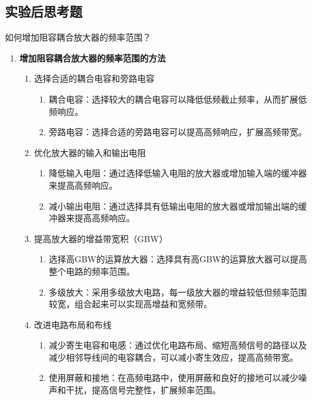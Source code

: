\documentclass[dvipsnames, svgnames,a4paper,11pt]{article}
\begin{document}
	
	

	\clearpage

	\subsection{实验后思考题}
	
	\begin{question}
		如何增加阻容耦合放大器的频率范围？
	\end{question}
	
		\begin{enumerate}
			\item \textbf{增加阻容耦合放大器的频率范围的方法}
			\begin{enumerate}
				\item 选择合适的耦合电容和旁路电容
				\begin{enumerate}
					\item 耦合电容：选择较大的耦合电容可以降低低频截止频率，从而扩展低频响应。
					\item 旁路电容：选择合适的旁路电容可以提高高频响应，扩展高频带宽。
				\end{enumerate}
				
				\item 优化放大器的输入和输出电阻
				\begin{enumerate}
					\item 降低输入电阻：通过选择低输入电阻的放大器或增加输入端的缓冲器来提高高频响应。
					\item 减小输出电阻：通过选择具有低输出电阻的放大器或增加输出端的缓冲器来提高高频响应。
				\end{enumerate}
		
				\item 提高放大器的增益带宽积（GBW）
				\begin{enumerate}
					\item 选择高GBW的运算放大器：选择具有高GBW的运算放大器可以提高整个电路的频率范围。
					\item 多级放大：采用多级放大电路，每一级放大器的增益较低但频率范围较宽，组合起来可以实现高增益和宽频带。
				\end{enumerate}
		
				\item 改进电路布局和布线
				\begin{enumerate}
					\item 减少寄生电容和电感：通过优化电路布局、缩短高频信号的路径以及减少相邻导线间的电容耦合，可以减小寄生效应，提高高频带宽。
					\item 使用屏蔽和接地：在高频电路中，使用屏蔽和良好的接地可以减少噪声和干扰，提高信号完整性，扩展频率范围。
				\end{enumerate}
		

\end{enumerate}
\end{enumerate}
\end{document}
